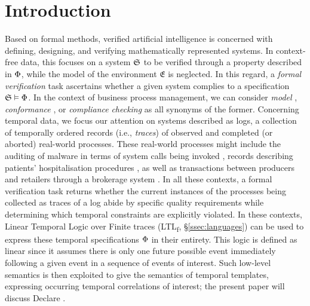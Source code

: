 \documentclass[sigconf]{acmart}
\begin{document}
\section{Introduction}
Based on formal methods, verified artificial intelligence \cite{DBLP:journals/cacm/SeshiaSS22} is concerned with defining, designing, and verifying mathematically represented systems. In context-free data, this focuses on a system $\mathfrak{S}$ to be verified through a property described in $\Phi$, while the model of the environment $\mathfrak{E}$ is neglected. In this regard, a \textit{formal verification} task ascertains whether a given system complies to a specification $\mathfrak{S}\vDash \Phi$. 
In the context of business process management, we can consider \textit{model} \cite{DBLP:books/daglib/0020348}, \textit{conformance} \cite{DBLP:conf/bpm/BergamiMMM21}, or \textit{compliance} \cite{DBLP:conf/bpm/AwadDW08,WEIDLICH20111009} \textit{checking} as all synonyms of the former. Concerning temporal data, we focus our attention on systems described as logs, a collection of temporally ordered records (i.e., \textit{traces}) of observed and completed (or aborted) real-world  processes. These real-world processes might include the auditing of malware in terms of system calls being invoked \cite{10.7717/peerj-cs.346,DBLP:conf/siu/YaziCG19}, records describing patients' hospitalisation procedures  \cite{8782520,XuPYYLZ20,https://doi.org/10.4121/uuid:d9769f3d-0ab0-4fb8-803b-0d1120ffcf54}, as well as transactions between producers and retailers through a brokerage system \cite{DBLP:conf/wbdb/PetermannJMR14}. In all these contexts, a formal verification task returns whether the current instances of the processes being collected as traces of a log abide by specific quality requirements while determining which temporal constraints are explicitly violated. In these contexts, Linear Temporal Logic over Finite traces (LTL\textsubscript{f}, \S\ref{ssec:languages}) \cite{DBLP:conf/ijcai/GiacomoV13} can be used to express these temporal specifications $\Phi$ in their entirety. This logic is defined as linear since it assumes there is only one future possible event immediately following a given event in a sequence of events of interest. Such low-level semantics is then exploited to give the semantics of temporal templates, expressing occurring temporal correlations of interest; the present paper will discuss Declare \cite{4384001}. 
\end{document}
